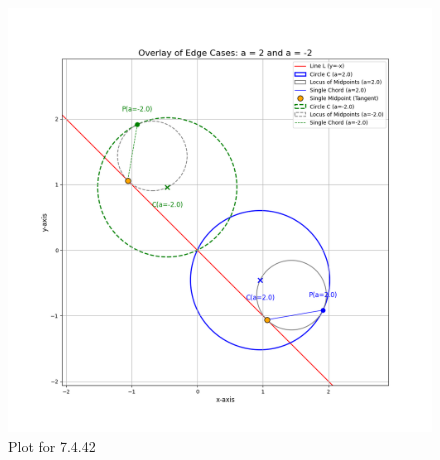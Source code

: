 \documentclass[journal,12pt,onecolumn]{IEEEtran}
\theoremstyle{remark}
\begin{document}
\begin{figure}[H]
    \centering
    \includegraphics[width=0.75\columnwidth]{figs/fig.png}
    \caption{Plot for 7.4.42}
\end{figure}
\end{document}
